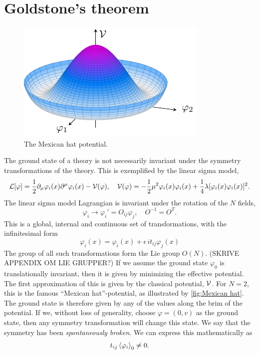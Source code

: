 \section{Goldstone's theorem}

\begin{figure}[h]
    \centering
    \includegraphics[]{figurer/mexican_hat.pdf}
    \caption{The Mexican hat potential.}
    \label{fig:Mexican hat}
\end{figure}


The ground state of a theory is not necessarily invariant under the symmetry transformations of the theory.
This is exemplified by the linear sigma model,
\begin{equation}
    \mathcal{L}[\varphi] 
    = \frac{1}{2} \partial_\mu \varphi_i(x) \partial^\mu \varphi_i(x) - \mathcal{V}(\varphi),
    \quad \mathcal{V}(\varphi) = - \frac{1}{2} \mu^2 \varphi_i(x)\varphi_i(x)
    + \frac{1}{4} \lambda [\varphi_i(x) \varphi_i(x)]^2.
\end{equation}
The linear sigma model Lagrangian is invariant under the rotation of the $N$ fields,
\begin{equation}
    \varphi_i \longrightarrow \varphi_i' = O_{ij} \varphi_j,
    \quad O^{-1} = O^{T}.
\end{equation}
This is a global, internal and continuous set of transformations, with the infinitesimal form
\begin{equation}
    \varphi_i(x) = \varphi_i(x) + \epsilon \, i t_{ij} \varphi_j(x)
\end{equation}
The group of all such transformations form the Lie group $O(N)$. (SKRIVE APPENDIX OM LIE GRUPPER?)
If we assume the ground state $\varphi_{0}$ is translationally invariant, then it is given by minimizing the effective potential.
The first approximation of this is given by the classical potential, $\mathcal{V}$.
For $N=2$, this is the famous ``Mexican hat''-potential, as illustrated by \autoref{fig:Mexican hat}.
The ground state is therefore given by any of the values along the brim of the potential.
If we, without loss of generality, choose $\varphi = (0, v)$ as the ground state, then any symmetry transformation will change this state.
We say that the symmetry has been \emph{spontaneously broken}.
We can express this mathematically as
\begin{equation}
    t_{ij} \ex{ \varphi_i}_0 \neq 0.
\end{equation}

